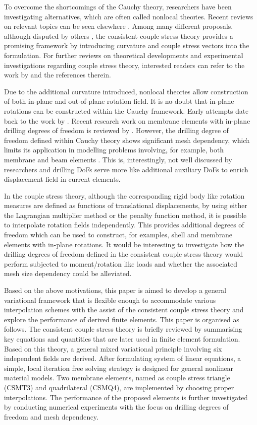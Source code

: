 \documentclass[3p,sort&compress,11pt,fleqn]{elsarticle}
\begin{document}
To overcome the shortcomings of the Cauchy theory, researchers have been investigating alternatives, which are often called nonlocal theories. Recent reviews on relevant topics can be seen elsewhere \citep{Maugin2010,Altenbach2011,Srinivasa2017,Shaat2020}. Among many different proposals, although disputed by others \citep{Neff2016}, the consistent couple stress theory \citep{Hadjesfandiari2011} provides a promising framework by introducing curvature and couple stress vectors into the formulation. For further reviews on theoretical developments and experimental investigations regarding couple stress theory, interested readers can refer to the work by \citet{Pedgaonkar2021} and the references therein.

Due to the additional curvature introduced, nonlocal theories allow construction of both in-plane and out-of-plane rotation field. It is no doubt that in-plane rotations can be constructed within the Cauchy framework. Early attempts date back to the work by \citet{Allman1984}. Recent research work on membrane elements with in-plane drilling degrees of freedom is reviewed by \citet{Boutagouga2020}. However, the drilling degree of freedom defined within Cauchy theory shows significant mesh dependency, which limits its application in modelling problems involving, for example, both membrane and beam elements \citep{Chang2020}. This is, interestingly, not well discussed by researchers and drilling DoFs serve more like additional auxiliary DoFs to enrich displacement field in current elements.

In the couple stress theory, although the corresponding rigid body like rotation measures are defined as functions of translational displacements, by using either the Lagrangian multiplier method or the penalty function method, it is possible to interpolate rotation fields independently. This provides additional degrees of freedom which can be used to construct, for examples, shell and membrane elements with in-plane rotations. It would be interesting to investigate how the drilling degrees of freedom defined in the consistent couple stress theory would perform subjected to moment/rotation like loads and whether the associated mesh size dependency could be alleviated.

Based on the above motivations, this paper is aimed to develop a general variational framework that is flexible enough to accommodate various interpolation schemes with the assist of the consistent couple stress theory \citep{Hadjesfandiari2011} and explore the performance of derived finite elements. This paper is organised as follows. The consistent couple stress theory is briefly reviewed by summarising key equations and quantities that are later used in finite element formulation. Based on this theory, a general mixed variational principle involving six independent fields are derived. After formulating system of linear equations, a simple, local iteration free solving strategy is designed for general nonlinear material models. Two membrane elements, named as couple stress triangle (CSMT3) and quadrilateral (CSMQ4), are implemented by choosing proper interpolations. The performance of the proposed elements is further investigated by conducting numerical experiments with the focus on drilling degrees of freedom and mesh dependency.
\end{document}
